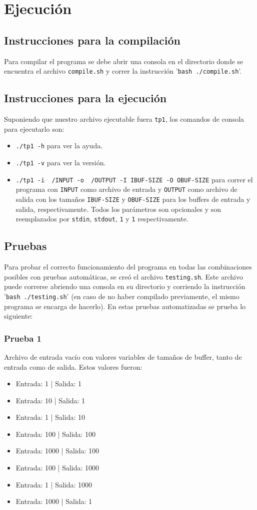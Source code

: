 \documentclass[a4paper, 10pt]{article}
\def\code#1{\texttt{#1}}
\begin{document}
	\section{Ejecución}
		\subsection{Instrucciones para la compilación}
			Para compilar el programa se debe abrir una consola en el directorio donde se encuentra el archivo
			\code{compile.sh} y correr la instrucción '\code{bash ./compile.sh}'.
		\subsection{Instrucciones para la ejecución}
			Suponiendo que nuestro archivo ejecutable fuera \code{tp1}, los comandos de consola para ejecutarlo
			son:
			\begin{itemize}
				\item \code{./tp1 -h} para ver la ayuda.
				\item \code{./tp1 -v} para ver la versión.
				\item \code{./tp1 -i ~/INPUT -o ~/OUTPUT -I IBUF-SIZE -O OBUF-SIZE} para correr el programa con \code{INPUT} 
				como archivo de entrada y \code{OUTPUT} como archivo de salida con los tamaños \code{IBUF-SIZE} y \code{OBUF-SIZE}
				para los buffers de entrada y salida, respectivamente. Todos los parámetros son opcionales y son reemplazados por 
				\code{stdin}, \code{stdout}, \code{1} y \code{1} respectivamente.
			\end{itemize}
		\subsection{Pruebas}
			Para probar el correcto funcionamiento del programa en todas las combinaciones posibles con pruebas automáticas, se 
			creó el archivo \code{testing.sh}. Este archivo puede correrse abriendo una consola en su directorio y corriendo la
			instrucción '\code{bash ./testing.sh}' (en caso de no haber compilado previamente, el mismo programa se encarga de
			hacerlo). En estas pruebas automatizadas se prueba lo siguiente:
			\subsubsection{Prueba 1}
				Archivo de entrada vacío con valores variables de tamaños de buffer, tanto de entrada como de salida. Estos valores
				fueron:
				\begin{itemize}
					\item Entrada: 1    | Salida: 1
					\item Entrada: 10   | Salida: 1
					\item Entrada: 1    | Salida: 10
					\item Entrada: 100  | Salida: 100
					\item Entrada: 1000 | Salida: 100
					\item Entrada: 100  | Salida: 1000
					\item Entrada: 1    | Salida: 1000
					\item Entrada: 1000 | Salida: 1
				\end{itemize}
\end{document}
